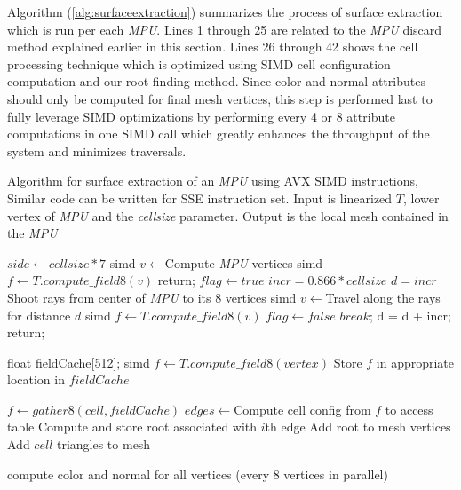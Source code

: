 Algorithm (\ref{alg:surfaceextraction}) summarizes the process of surface extraction which is run per each \textit{MPU}. 
Lines 1 through 25 are related to the \textit{MPU} discard method explained earlier in this section. Lines 26 through 42
shows the cell processing technique which is optimized using SIMD cell configuration computation and our root 
finding method. Since color and normal attributes should only be computed for final mesh vertices, this step is 
performed last to fully leverage SIMD optimizations by performing every 4 or 8 attribute computations in 
one SIMD call which greatly enhances the throughput of the system and minimizes \blob traversals.

\begin{algorithm}
\caption{Algorithm for surface extraction of an \textit{MPU} using AVX SIMD instructions,
Similar code can be written for SSE instruction set. 
Input is linearized \blob $T$, lower vertex of \textit{MPU} and the \textit{cellsize} parameter. 
Output is the local mesh contained in the \textit{MPU}}
\label{alg:surfaceextraction}
\begin{algorithmic}[1]		
	\STATE $side \gets cellsize*7$
	\STATE simd $v \gets $Compute \textit{MPU} vertices
	\STATE simd $f \gets T.compute\_field8(v)$
	  \STATE return;
	  \ENDIF	
	\ELSE 
	  \STATE $flag \gets true$
	  \STATE $incr = 0.866*cellsize$	  
	  \STATE $d = incr$
	  \STATE Shoot rays from center of \textit{MPU} to its 8 vertices
	  \STATE simd $v \gets $Travel along the rays for distance $d$     
	  \STATE simd $f \gets T.compute\_field8(v)$
	  \STATE $flag \gets false$
	  \STATE $break$;
	  \ENDIF
	  \STATE d = d + incr;
	  \ENDWHILE	
	  \STATE return;
	  \ENDIF	
	\ENDIF	
	
	\STATE float fieldCache[512];
	\STATE simd $f \gets T.compute\_field8(vertex)$
	\STATE Store $f$ in appropriate location in $fieldCache$
	\ENDFOR
	
	
		\STATE $f \gets gather8(cell, fieldCache)$
		\STATE $edges \gets $Compute cell config from $f$ to access table
			\STATE Compute and store root associated with $i$th edge		
			\STATE Add root to mesh vertices
			\ENDIF
		\ENDFOR				
		\STATE Add $cell$ triangles to mesh
	\ENDFOR	
	
	\STATE compute color and normal for all vertices (every 8 vertices in parallel)
\end{algorithmic}
\end{algorithm}

